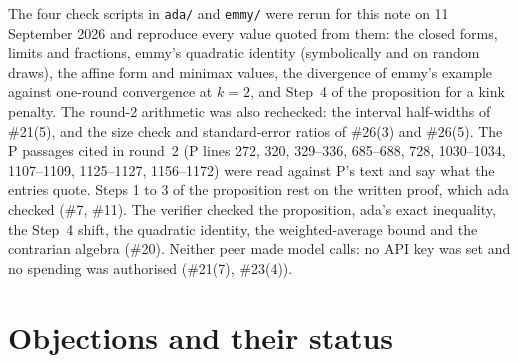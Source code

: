 \documentclass{article}
\begin{document}
The four check scripts in \texttt{ada/} and \texttt{emmy/} were rerun for
this note on 11 September 2026 and reproduce every value quoted from them:
the closed forms, limits and fractions, emmy's quadratic identity
(symbolically and on random draws), the affine form and minimax values,
the divergence of emmy's example against one-round convergence at $k=2$,
and Step~4 of the proposition for a kink penalty. The round-2 arithmetic
was also rechecked: the interval half-widths of \#21(5), and the size
check and standard-error ratios of \#26(3) and \#26(5). The P passages
cited in round~2 (P lines 272, 320, 329--336, 685--688, 728, 1030--1034,
1107--1109, 1125--1127, 1156--1172) were read against P's text and say what
the entries quote. Steps 1 to 3 of the proposition rest on the written
proof, which ada checked (\#7, \#11). The verifier checked the
proposition, ada's exact inequality, the Step~4 shift, the quadratic
identity, the weighted-average bound and the contrarian algebra (\#20).
Neither peer made model calls: no API key was set and no spending was
authorised (\#21(7), \#23(4)).

\section{Objections and their status}
\end{document}
